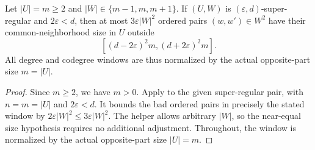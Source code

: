 \begin{lemma}
Let $|U|=m\geq2$ and $|W|\in\{m-1,m,m+1\}$.  If $(U,W)$ is $(\varepsilon,d)$-super-regular and $2\varepsilon<d$, then at most
$3\varepsilon|W|^2$ ordered pairs $(w,w')\in W^2$ have their common-neighborhood size in $U$ outside
\[
 [(d-2\varepsilon)^2m,(d+2\varepsilon)^2m].
\]
All degree and codegree windows are thus normalized by the actual opposite-part size $m=|U|$.
\end{lemma}
\begin{proof}
Since $m\geq2$, we have $m>0$.
Apply  to the given
super-regular pair, with $n=m=|U|$ and $2\varepsilon<d$.
It bounds the bad ordered pairs in precisely the stated window by
$2\varepsilon|W|^2\leq3\varepsilon|W|^2$.
The helper allows arbitrary $|W|$, so the near-equal size hypothesis
requires no additional adjustment.  Throughout, the window is
normalized by the actual opposite-part size $|U|=m$.
\end{proof}
